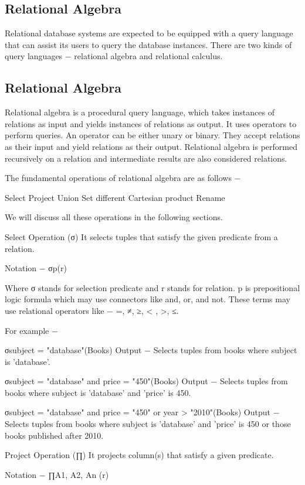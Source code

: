 \subsection{Relational Algebra}

Relational database systems are expected to be equipped with a query language that can assist its users to query the database instances. There are two kinds of query languages − relational algebra and relational calculus.

\subsection{Relational Algebra}
Relational algebra is a procedural query language, which takes instances of relations as input and yields instances of relations as output. It uses operators to perform queries. An operator can be either unary or binary. They accept relations as their input and yield relations as their output. Relational algebra is performed recursively on a relation and intermediate results are also considered relations.

The fundamental operations of relational algebra are as follows −

Select
Project
Union
Set different
Cartesian product
Rename

We will discuss all these operations in the following sections.

Select Operation (σ)
It selects tuples that satisfy the given predicate from a relation.

Notation − σp(r)

Where σ stands for selection predicate and r stands for relation. p is prepositional logic formula which may use connectors like and, or, and not. These terms may use relational operators like − =, ≠, ≥, < ,  >,  ≤.

For example −

σsubject = "database"(Books)
Output − Selects tuples from books where subject is 'database'.

σsubject = "database" and price = "450"(Books)
Output − Selects tuples from books where subject is 'database' and 'price' is 450.

σsubject = "database" and price = "450" or year > "2010"(Books)
Output − Selects tuples from books where subject is 'database' and 'price' is 450 or those books published after 2010.

Project Operation (∏)
It projects column(s) that satisfy a given predicate.

Notation − ∏A1, A2, An (r)

